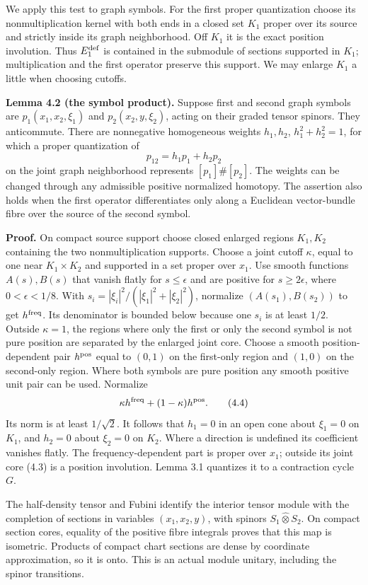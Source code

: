 \documentclass[
  11pt,
]{article}
\begin{document}
We apply this test to graph symbols. For the first proper quantization
choose its nonmultiplication kernel with both ends in a closed set
\(K_1\) proper over its source and strictly inside its graph
neighborhood. Off \(K_1\) it is the exact position involution. Thus
\(E_1^{\rm def}\) is contained in the submodule of sections supported in
\(K_1\); multiplication and the first operator preserve this support. We
may enlarge \(K_1\) a little when choosing cutoffs.

\textbf{Lemma 4.2 (the symbol product).} Suppose first and second graph
symbols are \(p_1(x_1,x_2,\xi_1)\) and \(p_2(x_2,y,\xi_2)\), acting on
their graded tensor spinors. They anticommute. There are nonnegative
homogeneous weights \(h_1,h_2\), \(h_1^2+h_2^2=1\), for which a proper
quantization of \[
 p_{12}=h_1p_1+h_2p_2
 \tag{4.3}
\] on the joint graph neighborhood represents \([p_1]\#[p_2]\). The
weights can be changed through any admissible positive normalized
homotopy. The assertion also holds when the first operator
differentiates only along a Euclidean vector-bundle fibre over the
source of the second symbol.

\textbf{Proof.} On compact source support choose closed enlarged regions
\(K_1,K_2\) containing the two nonmultiplication supports. Choose a
joint cutoff \(\kappa\), equal to one near \(K_1\times K_2\) and
supported in a set proper over \(x_1\). Use smooth functions
\(A(s),B(s)\) that vanish flatly for \(s\leq\epsilon\) and are positive
for \(s\geq2\epsilon\), where \(0<\epsilon<1/8\). With
\(s_i=|\xi_i|^2/(|\xi_1|^2+|\xi_2|^2)\), normalize \((A(s_1),B(s_2))\)
to get \(h^{\rm freq}\). Its denominator is bounded below because one
\(s_i\) is at least \(1/2\). Outside \(\kappa=1\), the regions where
only the first or only the second symbol is not pure position are
separated by the enlarged joint core. Choose a smooth position-dependent
pair \(h^{\rm pos}\) equal to \((0,1)\) on the first-only region and
\((1,0)\) on the second-only region. Where both symbols are pure
position any smooth positive unit pair can be used. Normalize \[
 \kappa h^{\rm freq}+(1-\kappa)h^{\rm pos}.
 \tag{4.4}
\] Its norm is at least \(1/\sqrt2\). It follows that \(h_1=0\) in an
open cone about \(\xi_1=0\) on \(K_1\), and \(h_2=0\) about \(\xi_2=0\)
on \(K_2\). Where a direction is undefined its coefficient vanishes
flatly. The frequency-dependent part is proper over \(x_1\); outside its
joint core (4.3) is a position involution. Lemma 3.1 quantizes it to a
contraction cycle \(G\).

The half-density tensor and Fubini identify the interior tensor module
with the completion of sections in variables \((x_1,x_2,y)\), with
spinors \(S_1\widehat\otimes S_2\). On compact section cores, equality
of the positive fibre integrals proves that this map is isometric.
Products of compact chart sections are dense by coordinate
approximation, so it is onto. This is an actual module unitary,
including the spinor transitions.
\end{document}
